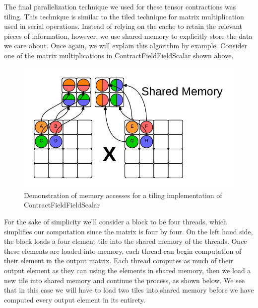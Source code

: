 The final parallelization technique we used for these tensor contractions was tiling. This technique is similar to the tiled technique for matrix multiplication used in serial operations. Instead of relying on the cache to retain the relevant pieces of information, however, we use shared memory to explicitly store the data we care about. Once again, we will explain this algorithm by example. Consider one of the matrix multiplications in ContractFieldFieldScalar shown above. 

\begin{figure}
    \centering
    \includegraphics[scale = .7]{ContractFieldFieldScalarGraphicTiling}
    \caption{Demonstration of memory accesses for a tiling implementation of ContractFieldFieldScalar}
\end{figure}

For the sake of simplicity we'll consider a block to be four threads, which simplifies our computation since the matrix is four by four. On the left hand side, the block loads a four element tile into the shared memory of the threads. Once these elements are loaded into memory, each thread can begin computation of their element in the output matrix. Each thread computes as much of their output element as they can using the elements in shared memory, then we load a new tile into shared memory and continue the process, as shown below. We see that in this case we will have to load two tiles into shared memory before we have computed every output element in its entirety. 

